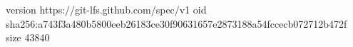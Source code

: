 version https://git-lfs.github.com/spec/v1
oid sha256:a743f3a480b5800eeb26183ce30f90631657e2873188a54fccecb072712b472f
size 43840
